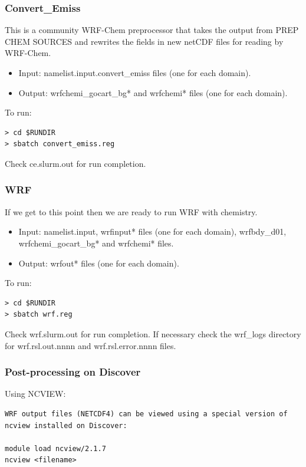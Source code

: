 \begin{frame}[fragile]\frametitle{Convert\_Emiss}

\footnotesize{
This is a community WRF-Chem preprocessor that takes the output from PREP CHEM SOURCES and rewrites the fields in new netCDF files for reading by WRF-Chem.
\begin{itemize}
\item Input: namelist.input.convert\_emiss files (one for each domain).
\item Output: wrfchemi\_gocart\_bg* and wrfchemi* files (one for each domain).
\end{itemize}
}    
\hrulefill\par
\footnotesize{To run:}
\begin{lstlisting}
> cd $RUNDIR
> sbatch convert_emiss.reg
\end{lstlisting}
Check ce.slurm.out  for run completion.


\end{frame}

\begin{frame}[fragile]\frametitle{WRF}

\footnotesize{
\hrulefill\par       
If we get to this point then we are ready to run WRF with chemistry.
\begin{itemize}
\item Input: namelist.input, wrfinput* files (one for each domain), wrfbdy\_d01, wrfchemi\_gocart\_bg* and wrfchemi* files.
\item Output: wrfout* files (one for each domain).
\end{itemize}
}    
\hrulefill\par
\footnotesize{To run:}
\begin{lstlisting}
> cd $RUNDIR
> sbatch wrf.reg
\end{lstlisting}
Check wrf.slurm.out for run completion.
If necessary check the wrf\_logs directory for wrf.rsl.out.nnnn and wrf.rsl.error.nnnn files.

\end{frame}

\begin{frame}[fragile]
\frametitle{Post-processing on Discover}

Using NCVIEW:

\begin{lstlisting}
WRF output files (NETCDF4) can be viewed using a special version of ncview installed on Discover:

module load ncview/2.1.7
ncview <filename>
\end{lstlisting}

\end{frame}

